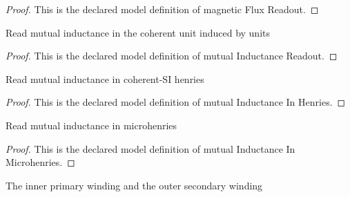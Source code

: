 \begin{proof}
  This is the declared model definition of magnetic Flux Readout.
\end{proof}
\begin{definition}
  \label{def:physics:phyx-mini-0921:phyxminiproblems-problemphyxmini0921-mutualinductancereadout}
  Read mutual inductance in the coherent unit induced by units
\end{definition}
\begin{proof}
  This is the declared model definition of mutual Inductance Readout.
\end{proof}
\begin{definition}
  \label{def:physics:phyx-mini-0921:phyxminiproblems-problemphyxmini0921-mutualinductanceinhenries}
  Read mutual inductance in coherent-SI henries
\end{definition}
\begin{proof}
  This is the declared model definition of mutual Inductance In Henries.
\end{proof}
\begin{definition}
  \label{def:physics:phyx-mini-0921:phyxminiproblems-problemphyxmini0921-mutualinductanceinmicrohenries}
  Read mutual inductance in microhenries
\end{definition}
\begin{proof}
  This is the declared model definition of mutual Inductance In Microhenries.
\end{proof}
\begin{definition}
  \label{def:physics:phyx-mini-0921:phyxminiproblems-problemphyxmini0921-coilrole}
  The inner primary winding and the outer secondary winding
\end{definition}
